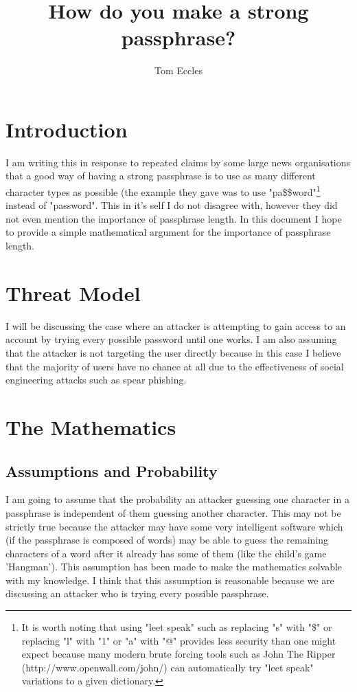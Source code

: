\documentclass[11pt,a4paper]{article}
\begin{document}
\title{How do you make a strong passphrase?}
\author{Tom Eccles}
\maketitle

\section{Introduction}
I am writing this in response to repeated claims by some large news organisations that a good way of having a strong passphrase is to use as many different character types as possible (the example they gave was to use "pa\$\$word"\footnote{It is worth noting that using "leet speak" such as replacing "s" with "\$" or replacing "l" with "1" or "a" with "@" provides less security than one might expect because many modern brute forcing tools such as John The Ripper (http://www.openwall.com/john/) can automatically try "leet speak" variations to a given dictionary.} instead of "password". This in it's self I do not disagree with, however they did not even mention the importance of passphrase length. In this document I hope to provide a simple mathematical argument for the importance of passphrase length. 

\section{Threat Model}
I will be discussing the case where an attacker is attempting to gain access to an account by trying every possible password until one works. I am also assuming that the attacker is not targeting the user directly because in this case I believe that the majority of users have no chance at all due to the effectiveness of social engineering attacks such as spear phishing. 

\section{The Mathematics}
\subsection{Assumptions and Probability}
I am going to assume that the probability an attacker guessing one character in a passphrase is independent of them guessing another character. This may not be strictly true because the attacker may have some very intelligent software which (if the passphrase is composed of words) may be able to guess the remaining characters of a word after it already has some of them (like the child's game 'Hangman'). This assumption has been made to make the mathematics solvable with my knowledge. I think that this assumption is reasonable because we are discussing an attacker who is trying every possible passphrase.
\end{document}
